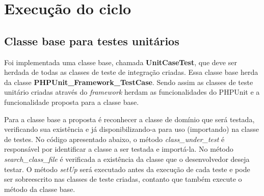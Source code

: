   \section{Execução do ciclo}
      
    \subsection{Classe base para testes unitários}

        Foi implementada uma classe base, chamada \textbf{UnitCaseTest}, que deve ser herdada de todas as classes de teste de integração criadas. 
        Essa classe base herda da classe \textbf{PHPUnit\_Framework\_TestCase}. Sendo assim as classes de teste unitário criadas através do \textit{framework} herdam as funcionalidades do PHPUnit e a funcionalidade proposta para a classe base.

        Para a classe base a proposta é reconhecer a classe de domínio que será testada, verificando sua existência e já disponibilizando-a para uso (importando) na classe de testes. No código apresentado abaixo, o método \textit{class\_under\_test} é responsável por identificar a classe a ser testada e importá-la. No método \textit{search\_class\_file} é verificada a existência da classe que o desenvolvedor deseja testar. O método \textit{setUp} será executado antes da execução de cada teste e pode ser sobreescrito nas classes de teste criadas, contanto que também execute o método da classe base.  

